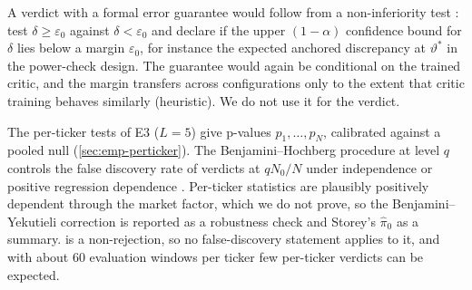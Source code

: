 \begin{table}[tbp]
  \centering
  \caption{Calibration of the verdict rule in the power-check designs: nominal boundary size and
    power at $\alpha=0.05$, estimated $\alpha$-quantile $\hat c_\alpha$ of the boundary $\pmed$
    (the $\lfloor\alpha R\rfloor$-th smallest of the $R$ boundary values), boundary size and
    size-adjusted power at $\hat c_\alpha$ (\cref{def:power-check}), and the number of replications
    in which the alternative $\pmed$ is below the boundary $\pmed$ of the same replication. Main
    split: E3 (\cref{tab:e3-power}); alternative split: E5 (\cref{tab:manual-e5-split}). $R$
    replications, $S$ synthetic seeds. Derived from \texttt{results/e3/e3\_power\_raw.csv},
    \texttt{e3\_realvol\_raw.csv} and \texttt{results/e5/e5\_split\_power\_raw.csv} by
    \texttt{paper/scripts/theory\_calibration.py}.}
  \label{tab:manual-theory-calibration}
  \small
\end{table}

\begin{remark}\label{rem:equivalence}
A \GOOD{} verdict with a formal error guarantee would follow from a non-inferiority test
\citep{schuirmann_1987_comparison}: test $\delta\ge\varepsilon_0$ against $\delta<\varepsilon_0$ and
declare \GOOD{} if the upper $(1-\alpha)$ confidence bound for $\delta$ lies below a margin
$\varepsilon_0$, for instance the expected anchored discrepancy at $\vartheta^*$ in the power-check
design. The guarantee would again be conditional on the trained critic, and the margin transfers
across configurations only to the extent that critic training behaves similarly (heuristic). We do
not use it for the verdict.
\end{remark}

\begin{remark}\label{rem:bh}
The per-ticker tests of E3 ($L=5$) give p-values $p_1,\dots,p_N$, calibrated against a pooled
\GARCHt{} null (\cref{sec:emp-perticker}). The Benjamini--Hochberg procedure at level $q$ controls
the false discovery rate of \BAD{} verdicts at $qN_0/N$ under independence or positive regression
dependence \citep{benjamini1995controlling,benjamini2001control}. Per-ticker statistics are
plausibly positively dependent through the market factor, which we do not prove, so the
Benjamini--Yekutieli correction is reported as a robustness check and Storey's $\hat\pi_0$
\citep{storey_2002_direct} as a summary. \GOOD{} is a non-rejection, so no false-discovery
statement applies to it, and with about 60 evaluation windows per ticker few per-ticker \GOOD{}
verdicts can be expected.
\end{remark}

